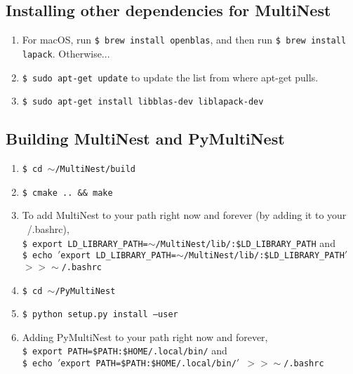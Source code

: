\documentclass[11pt]{article}
\begin{document}
\subsection{Installing other dependencies for MultiNest}
\begin{enumerate}
    \item For macOS, run {\tt \$ brew install openblas}, and then run {\tt \$ brew install lapack}. Otherwise...
	\item {\tt \$ sudo apt-get update} to update the list from where apt-get pulls.
	\item {\tt \$ sudo apt-get install libblas-dev liblapack-dev}
\end{enumerate}

\subsection{Building MultiNest and PyMultiNest}
\begin{enumerate}
	\item {\tt \$ cd $\sim$/MultiNest/build}
	\item {\tt \$ cmake .. \&\& make}
	\item To add MultiNest to your path right now and forever (by adding it to your ~/.bashrc), \\{\tt \$ export LD\_LIBRARY\_PATH=$\sim$/MultiNest/lib/:\$LD\_LIBRARY\_PATH} and \\{\tt \$ echo $'$export LD\_LIBRARY\_PATH=$\sim$/MultiNest/lib/:\$LD\_LIBRARY\_PATH$'$ $>>\sim$/.bashrc}
	\item {\tt \$ cd $\sim$/PyMultiNest}
	\item {\tt \$ python setup.py install --user}
	\item Adding PyMultiNest to your path right now and forever,\\{\tt \$ export PATH=\$PATH:\$HOME/.local/bin/} and \\{\tt \$ echo $'$export PATH=\$PATH:\$HOME/.local/bin/$'$ $>>\sim$/.bashrc}
\end{enumerate}
\end{document}
